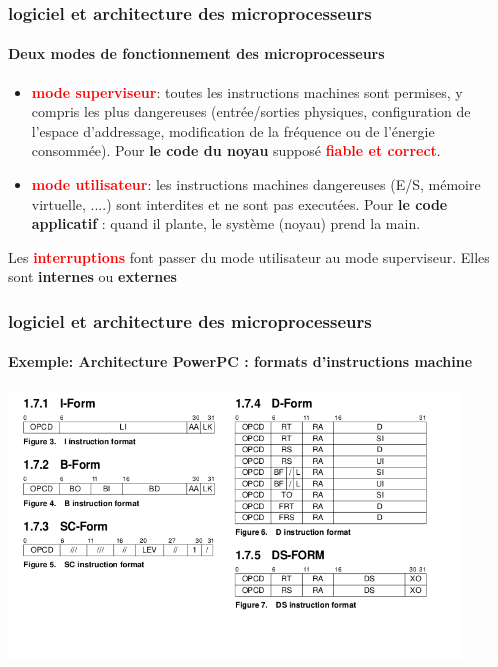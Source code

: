 \documentclass[xcolor=svgnames,final,smaller,a4]{beamer}
\begin{document}
\begin{frame}
  \frametitle{logiciel et architecture des microprocesseurs}
  \framesubtitle{Deux modes de fonctionnement des microprocesseurs}

  \begin{itemize}
  \item \textcolor{red}{\textbf{mode superviseur}}: toutes les
    instructions machines sont permises, y compris les plus
    dangereuses (entrée/sorties physiques, configuration de l'espace
    d'addressage, modification de la fréquence ou de l'énergie
    consommée). Pour \textbf{le code du noyau} supposé  \textcolor{red}{\textbf{fiable et correct}}.

    \item \textcolor{red}{\textbf{mode utilisateur}}: les instructions
      machines dangereuses (E/S, mémoire virtuelle, ....)  sont
      interdites et ne sont pas executées. Pour \textbf{le code
        applicatif} : quand il plante, le système (noyau) prend la
      main.
    
  \end{itemize}


  Les \textcolor{red}{\textbf{interruptions}} font passer du mode
  utilisateur au mode superviseur. Elles sont \textbf{internes}
  {} ou \textbf{externes}
  {}
\end{frame}

\begin{frame}
  \frametitle{logiciel et architecture des microprocesseurs}
  \framesubtitle{Exemple: Architecture PowerPC : formats d'instructions machine}
  \includegraphics[width=0.9\textwidth]{powerpc-instr-format}
  

\end{frame}
\end{document}
